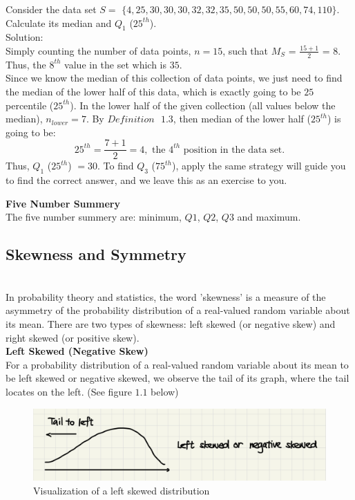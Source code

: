  \begin{example}
Consider the data set $S = $ $\{4, 25, 30, 30, 30, 32, 32, 35, 50, 50, 50, 55, 60, 74, 110\}$. Calculate its median and $Q_1$ ($25^{th}$).\\
Solution:\\
Simply counting the number of data points, $n = 15$, such that $M_{S}$ = $\frac{15 + 1}{2}$ = $8$. Thus, the $8^{th}$ value in the set which is $35$.\\
Since we know the median of this collection of data points, we just need to find the median of the lower half of this data, which is exactly going to be $25$ percentile ($25^{th}$). In the lower half of the given collection (all values below the median), $n_{lower} = 7$. By $Definition \text{ } 1.3$, then median of the lower half ($25^{th}$) is going to be: \[ 25^{th} = \frac{7+1}{2} = 4, \text{ the $4^{th}$ position in the data set}.\] Thus, $Q_1$ ($25^{th}$) $= 30$. To find $Q_3$ ($75^{th}$), apply the same strategy will guide you to find the correct answer, and we leave this as an exercise to you.
\end{example}

\textbf{Five Number Summery}\\

\noindent
The five number summery are: minimum, $Q1$, $Q2$, $Q3$ and maximum.


\subsection{Skewness and Symmetry}\\

In probability theory and statistics, the word 'skewness' is a measure of the asymmetry of the probability distribution of a real-valued random variable about its mean. There are two types of skewness: left skewed (or negative skew) and right skewed (or positive skew).\\

\noindent
\textbf{Left Skewed (Negative Skew)}\\

\noindent
For a probability distribution of a real-valued random variable about its mean to be left skewed or negative skewed, we observe the tail of its graph, where the tail locates on the left. (See figure $1.1$ below)

\begin{figure}[H]
 \centering
 \includegraphics[scale=0.25]{Section1/img/LeftSkewed.jpg}
 \caption{Visualization of a left skewed distribution}
\end{figure}

